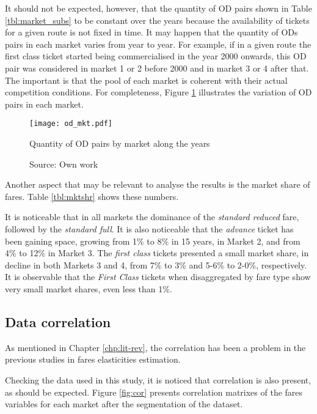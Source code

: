 

It should not be expected, however, that the quantity of OD pairs shown in Table \ref{tbl:market_subs} to be constant over the years because the availability of tickets for a given route is not fixed in time. It may happen that the quantity of ODs pairs in each market varies from year to year. For example, if in a given route the first class ticket started being commercialised in the year 2000 onwards, this OD pair was considered in market 1 or 2 before 2000 and in market 3 or 4 after that. The important is that the pool of each market is coherent with their actual competition conditions. For completeness, Figure \ref{fig:od_mkts} illustrates the variation of OD pairs in each market.

\begin{figure}[H]
\centering
\texttt{[image: od\_mkt.pdf]}
\caption{Quantity of OD pairs by market along the years}
\label{fig:od_mkts}
\caption*{Source: Own work}
\end{figure} 

Another aspect that may be relevant to analyse the results is the market share of fares. Table \ref{tbl:mktshr} shows these numbers.

It is noticeable that in all markets the dominance of the \textit{standard reduced} fare, followed by the \textit{standard full}. It is also noticeable that the \textit{advance} ticket has been gaining space, growing from 1\% to 8\% in 15 years, in Market 2, and from 4\% to 12\% in Market 3. The \textit{first class} tickets presented a small market share, in decline in both Markets 3 and 4, from 7\% to 3\% and 5-6\% to 2-0\%, respectively. It is observable that the \textit{First Class} tickets when disaggregated by fare type show very small market shares, even less than 1\%.

\begin{landscape}

\end{landscape}

\subsection{Data correlation}

As mentioned in Chapter \ref{chp:lit-rev}, the correlation has been a problem in the previous studies in fares elasticities estimation.

Checking the data used in this study, it is noticed that correlation is also present, as should be expected. Figure \ref{fig:cor} presents correlation matrixes of the fares variables for each market after the segmentation of the dataset.

